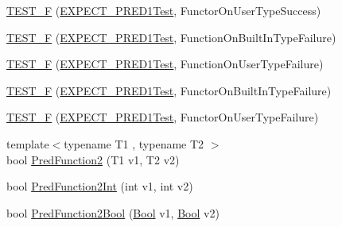 \begin{DoxyCompactItemize}
\item 
\mbox{\hyperlink{googletest-master_2googletest_2test_2gtest__pred__impl__unittest_8cc_acaedb8d892427455232522cca9d0ce36}{T\+E\+S\+T\+\_\+F}} (\mbox{\hyperlink{googletest-master_2googletest_2test_2gtest__pred__impl__unittest_8cc_ad745775376a8f891faadd4d168798bab}{E\+X\+P\+E\+C\+T\+\_\+\+P\+R\+E\+D1\+Test}}, Functor\+On\+User\+Type\+Success)
\item 
\mbox{\hyperlink{googletest-master_2googletest_2test_2gtest__pred__impl__unittest_8cc_a33183522648e7235772c7ae107918e2d}{T\+E\+S\+T\+\_\+F}} (\mbox{\hyperlink{googletest-master_2googletest_2test_2gtest__pred__impl__unittest_8cc_ad745775376a8f891faadd4d168798bab}{E\+X\+P\+E\+C\+T\+\_\+\+P\+R\+E\+D1\+Test}}, Function\+On\+Built\+In\+Type\+Failure)
\item 
\mbox{\hyperlink{googletest-master_2googletest_2test_2gtest__pred__impl__unittest_8cc_a6c7394c22028809dd2a31ec37021957d}{T\+E\+S\+T\+\_\+F}} (\mbox{\hyperlink{googletest-master_2googletest_2test_2gtest__pred__impl__unittest_8cc_ad745775376a8f891faadd4d168798bab}{E\+X\+P\+E\+C\+T\+\_\+\+P\+R\+E\+D1\+Test}}, Function\+On\+User\+Type\+Failure)
\item 
\mbox{\hyperlink{googletest-master_2googletest_2test_2gtest__pred__impl__unittest_8cc_a3a672df7ea6af2695c3f1a97c7b32714}{T\+E\+S\+T\+\_\+F}} (\mbox{\hyperlink{googletest-master_2googletest_2test_2gtest__pred__impl__unittest_8cc_ad745775376a8f891faadd4d168798bab}{E\+X\+P\+E\+C\+T\+\_\+\+P\+R\+E\+D1\+Test}}, Functor\+On\+Built\+In\+Type\+Failure)
\item 
\mbox{\hyperlink{googletest-master_2googletest_2test_2gtest__pred__impl__unittest_8cc_a00575e7356ae80bbd71ab684ccd65ac3}{T\+E\+S\+T\+\_\+F}} (\mbox{\hyperlink{googletest-master_2googletest_2test_2gtest__pred__impl__unittest_8cc_ad745775376a8f891faadd4d168798bab}{E\+X\+P\+E\+C\+T\+\_\+\+P\+R\+E\+D1\+Test}}, Functor\+On\+User\+Type\+Failure)
\item 
{\footnotesize template$<$typename T1 , typename T2 $>$ }\\bool \mbox{\hyperlink{googletest-master_2googletest_2test_2gtest__pred__impl__unittest_8cc_a6af405b7411fcd37c51a5fc96a869eef}{Pred\+Function2}} (T1 v1, T2 v2)
\item 
bool \mbox{\hyperlink{googletest-master_2googletest_2test_2gtest__pred__impl__unittest_8cc_a7a3b834b08a5176afbd4bfc97d06bedd}{Pred\+Function2\+Int}} (int v1, int v2)
\item 
bool \mbox{\hyperlink{googletest-master_2googletest_2test_2gtest__pred__impl__unittest_8cc_ab00487cdc08174c122cfaccc6abf221d}{Pred\+Function2\+Bool}} (\mbox{\hyperlink{struct_bool}{Bool}} v1, \mbox{\hyperlink{struct_bool}{Bool}} v2)

\end{DoxyCompactItemize}
